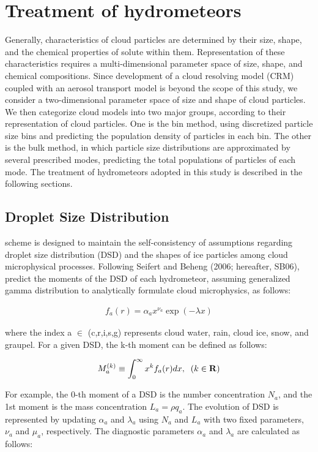 \section{Treatment of hydrometeors}
Generally, characteristics of cloud particles are determined by their size, shape, and the chemical properties of solute within them. Representation of these characteristics requires a multi-dimensional parameter space of size, shape, and chemical compositions. Since development of a cloud resolving model (CRM) coupled with an aerosol transport model is beyond the scope of this study, we consider a two-dimensional parameter space of size and shape of cloud particles. We then categorize cloud models into two major groups, according to their representation of cloud particles. One is the bin method, using discretized particle size bins and predicting the population density of particles in each bin. The other is the bulk method, in which particle size distributions are approximated by several prescribed modes, predicting the total populations of particles of each mode. The treatment of hydrometeors adopted in this study is described in the following sections.

\subsection{Droplet Size Distribution}
\citet{sn_2014} scheme is designed to maintain the self-consistency of assumptions regarding droplet size distribution (DSD) and the shapes of ice particles among cloud microphysical processes. Following Seifert and Beheng (2006; hereafter, SB06), \citet{sn_2014} predict the moments of the DSD of each hydrometeor, assuming generalized gamma distribution to analytically formulate cloud microphysics, as follows:

\begin{eqnarray}
f_{a}(r)=\alpha_{a}x^{\nu_{a}}\exp(-\lambda x)
\label{sn7}
\end{eqnarray}

where the index a $\in$ (c,r,i,s,g) represents cloud water, rain, cloud ice, snow, and graupel. For a given DSD, the k-th moment can be defined as follows:

\begin{eqnarray}
M^{(k)}_{a}\equiv \int_{0}^{\infty}x^{k}f_{a}(r)dx,\;\;(k\in {\bf R})
\label{sn8}
\end{eqnarray}

For example, the 0-th moment of a DSD is the number concentration $N_{a}$, and the 1st moment is the mass concentration $L_{a} = \rho q_{a}$. The evolution of DSD is represented by updating $\alpha_{a}$ and $\lambda_{a}$ using $N_{a}$ and $L_{a}$ with two fixed parameters, $\nu_{a}$ and $\mu_{a}$, respectively. The diagnostic parameters $\alpha_{a}$ and $\lambda_{a}$ are calculated as follows:

